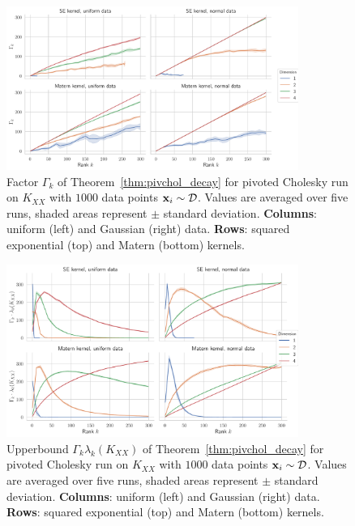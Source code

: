 \documentclass{article}
\begin{document}
\begin{figure}
    \centering
    \includegraphics[width=0.85\textwidth]{report/res/pivchol_gamma.pdf}
    \caption{Factor $\Gamma_k$ of Theorem~\ref{thm:pivchol_decay} for pivoted Cholesky run on $K_{XX}$ with $1000$ data points $\boldsymbol{\mathbf{x}}_i \sim \mathcal D$. Values are averaged over five runs, shaded areas represent $\pm$ standard deviation. \textbf{Columns}: uniform (left) and Gaussian (right) data. \textbf{Rows}: squared exponential (top) and Matern (bottom) kernels. }
    \label{fig:pivchol_gamma}
\end{figure}

\begin{figure}
    \centering
    \includegraphics[width=0.85\textwidth]{report/res/pivchol_upperbound.pdf}
    \caption{Upperbound $\Gamma_k \lambda_k(K_{XX})$ of Theorem~\ref{thm:pivchol_decay} for pivoted Cholesky run on $K_{XX}$ with $1000$ data points $\boldsymbol{\mathbf{x}}_i \sim \mathcal D$. Values are averaged over five runs, shaded areas represent $\pm$ standard deviation. \textbf{Columns}: uniform (left) and Gaussian (right) data. \textbf{Rows}: squared exponential (top) and Matern (bottom) kernels. }
    \label{fig:pivchol_upperbound}
\end{figure}
\end{document}
